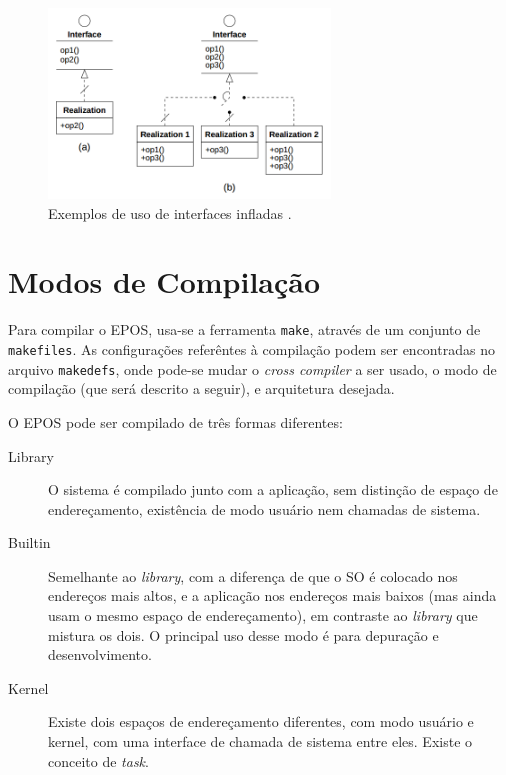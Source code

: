 \begin{figure}[ht!]
	\label{fig:inflated}
    \centering
    \includegraphics[width=7.5cm]{figuras/inflated_interface}
    \caption{Exemplos de uso de interfaces infladas \cite{guto_thesis}.}
\end{figure}




\section{Modos de Compilação}

Para compilar o EPOS, usa-se a ferramenta \verb+make+, através de um conjunto de \verb+makefiles+. As configurações referêntes à compilação podem ser encontradas no arquivo \verb+makedefs+, onde pode-se mudar o \emph{cross compiler} a ser usado, o modo de compilação (que será descrito a seguir), e arquitetura desejada.


O EPOS pode ser compilado de três formas diferentes:

\begin{description}
\item[Library] O sistema é compilado junto com a aplicação, sem distinção de espaço de endereçamento, existência de modo usuário nem chamadas de sistema.
\item[Builtin] Semelhante ao \emph{library}, com a diferença de que o SO é colocado nos endereços mais altos, e a aplicação nos endereços mais baixos (mas ainda usam o mesmo espaço de endereçamento), em contraste ao \emph{library} que mistura os dois. O principal uso desse modo é para depuração e desenvolvimento\cite{EPOS}.
\item[Kernel] Existe dois espaços de endereçamento diferentes, com modo usuário e kernel, com uma interface de chamada de sistema entre eles. Existe o conceito de \emph{task}.

\end{description}

